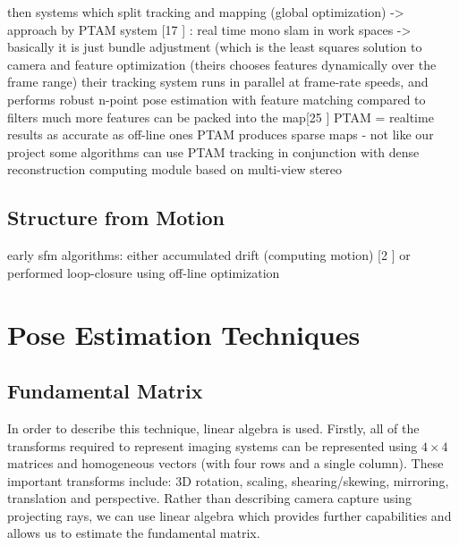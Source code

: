 then systems which split tracking and mapping (global optimization) -> approach by PTAM system [17 \cite{Klein07Parallel}]
: real time mono slam in work spaces -> basically it is just bundle adjustment (which is the least squares solution to camera and feature optimization (theirs chooses features dynamically over the frame range)
their tracking system runs in parallel at frame-rate speeds, and performs robust n-point pose estimation with feature matching
compared to filters much more features can be packed into the map[25 \cite{Strasdat10Real} ]
PTAM = realtime results as accurate as off-line ones
PTAM produces sparse maps - not like our project
some algorithms can use PTAM tracking in conjunction with dense reconstruction computing module based on multi-view stereo



\subsection{Structure from Motion}

early sfm algorithms: either accumulated drift (computing motion) [2 \cite{Beardsley97Sequential} ] or performed loop-closure using off-line optimization 


\section{Pose Estimation Techniques}


\subsection{Fundamental Matrix}

In order to describe this technique, linear algebra is used. Firstly, all of the transforms required to represent imaging systems can be represented using $4 \times 4$ matrices and homogeneous vectors (with four rows and a single column). These important transforms include: 3D rotation, scaling, shearing/skewing, mirroring, translation and perspective. Rather than describing camera capture using projecting rays, we can use linear algebra which provides further capabilities and allows us to estimate the fundamental matrix. 

